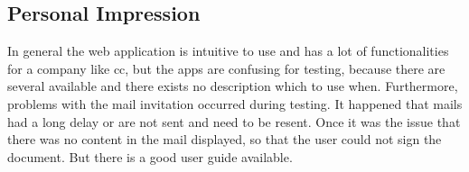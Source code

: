 \subsection{Personal Impression}
In general the web application is intuitive to use and has a lot of functionalities for a company like \gls{cc}, but the \glspl{app} are confusing for testing, because there are several available and there exists no description which to use when. Furthermore, problems with the mail invitation occurred during testing. It happened that mails had a long delay or are not sent and need to be resent. Once it was the issue that there was no content in the mail displayed, so that the user could not sign the document. But there is a good user guide available.